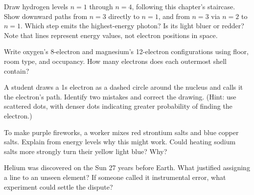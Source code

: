 \begin{sikaoti}
\item Draw hydrogen levels $n=1$ through $n=4$, following this chapter's staircase. Show downward paths from $n=3$ directly to $n=1$, and from $n=3$ via $n=2$ to $n=1$. Which step emits the highest-energy photon? Is its light bluer or redder? Note that lines represent energy values, not electron positions in space.
\item Write oxygen's 8-electron and magnesium's 12-electron configurations using floor, room type, and occupancy. How many electrons does each outermost shell contain?
\item A student draws a 1s electron as a dashed circle around the nucleus and calls it the electron's path. Identify two mistakes and correct the drawing. (Hint: use scattered dots, with denser dots indicating greater probability of finding the electron.)
\item To make purple fireworks, a worker mixes red strontium salts and blue copper salts. Explain from energy levels why this might work. Could heating sodium salts more strongly turn their yellow light blue? Why?
\item Helium was discovered on the Sun 27 years before Earth. What justified assigning a line to an unseen element? If someone called it instrumental error, what experiment could settle the dispute?
\end{sikaoti}

